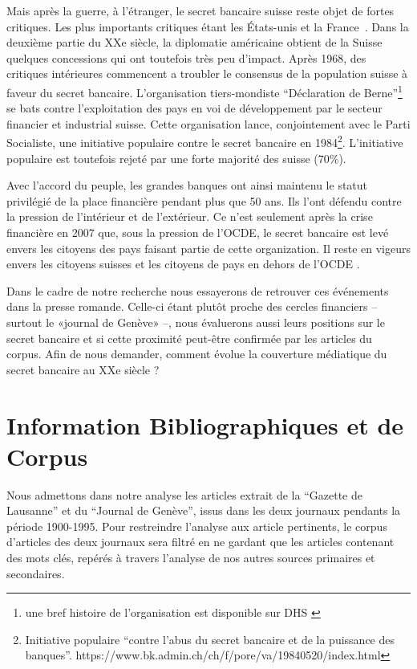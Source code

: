 \documentclass[11pt]{article}
\begin{document}
Mais après la guerre, à l'étranger, le secret bancaire suisse reste objet de
fortes critiques. Les plus importants critiques étant les États-unis et la
France~\citep[p.503]{Mazbouri12}. Dans la deuxième partie du XXe siècle, la
diplomatie américaine obtient de la Suisse quelques concessions qui ont
toutefois très peu d'impact.  Après 1968, des critiques intérieures commencent
a troubler le consensus de la population suisse à faveur du secret bancaire.
L’organisation tiers-mondiste “Déclaration de Berne”\footnote{une bref histoire
de l'organisation est disponible sur DHS \citep{EvB}} se bats contre
l'exploitation des pays en voi de développement par le secteur financier et
industrial suisse. Cette organisation lance, conjointement avec le Parti
Socialiste, une initiative populaire contre le secret bancaire en
1984\footnote{Initiative populaire ``contre l'abus du secret bancaire et de la
puissance des banques''.
https://www.bk.admin.ch/ch/f/pore/va/19840520/index.html}. L'initiative
populaire est toutefois rejeté par une forte majorité des suisse (70\%).

Avec l'accord du peuple, les grandes banques ont ainsi maintenu le
statut privilégié de la place financière pendant plus que 50 ans. Ils l’ont
défendu contre la pression de l’intérieur et de l’extérieur. Ce n’est
seulement après la crise financière en 2007 que, sous la pression de l'OCDE,
le secret bancaire est levé envers les citoyens des pays faisant partie de
cette organization. Il reste
en vigeurs envers les citoyens suisses et les citoyens de pays en dehors de
l'OCDE \citep{NeufVies}.

Dans le cadre de notre recherche nous essayerons de retrouver ces événements
dans la presse romande. Celle-ci étant plutôt proche des cercles financiers –
surtout le «journal de Genève» \citep{ConfClass1} –, nous évaluerons aussi
leurs positions sur le secret bancaire et si cette proximité peut-être
confirmée par les articles du corpus. Afin de nous demander, comment évolue la
couverture médiatique du secret bancaire au XXe siècle ? 

\section{Information Bibliographiques et de Corpus}
Nous admettons dans notre analyse les articles extrait de la “Gazette de
Lausanne” et du “Journal de Genève”, issus dans les deux journaux pendants la
période 1900-1995. Pour restreindre l’analyse aux article pertinents, le corpus
d’articles des deux journaux sera filtré en ne gardant que les articles
contenant des mots clés, repérés à travers l’analyse de nos autres sources
primaires et secondaires.
\end{document}
